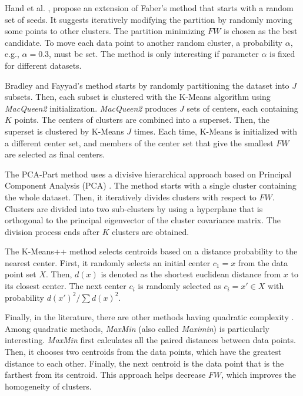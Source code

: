 \documentclass[runningheads,a4paper]{llncs}
\begin{document}
Hand et al. \cite{hand2005optimising}, propose an extension of Faber's method that starts with a random set of seeds. It suggests iteratively modifying the partition by randomly moving some points to other clusters. The partition  minimizing $FW$ is chosen as the best candidate. To move each data point to another random cluster, a probability $\alpha$, e.g., $\alpha = 0.3$, must be set. The method is only interesting if parameter $\alpha$ is fixed for different datasets.

Bradley and Fayyad's method \cite{bradley1998refining} starts by randomly partitioning the dataset into $J$ subsets. Then, each subset is clustered with the K-Means algorithm using \textit{MacQueen2} initialization. \textit{MacQueen2} produces $J$ sets of centers, each containing $K$ points. The centers of clusters are combined into a superset. Then, the superset is clustered by K-Means $J$ times. Each time, K-Means is initialized with a different center set, and members of the center set that give the smallest $FW$ are selected as final centers. 

The PCA-Part method \cite{su2007search} uses a divisive hierarchical approach based on Principal Component Analysis (PCA) \cite{wold1987principal}. The method starts with a single cluster containing the whole dataset. Then, it iteratively divides clusters with respect to $FW$. Clusters are divided into two sub-clusters by using a hyperplane that is orthogonal to the principal eigenvector of the cluster covariance matrix. The division process ends after $K$ clusters are obtained.  

The K-Means++ method \cite{arthur2007k} selects centroids based on a distance probability to the nearest center. First, it randomly selects an initial center $c_1 = x$ from the data point set $X$. Then, $d(x)$ is denoted as the shortest euclidean distance from $x$ to its closest center. The next center $c_i$ is randomly selected as $c_i = x' \in X$ with probability $d(x')^2/\sum d(x)^2$. 

Finally, in the literature, there are other methods having quadratic complexity \cite{lance1967general,astrahan1970speech}. Among quadratic methods, \textit{MaxMin} (also called \textit{Maximin}) \cite{gonzalez1985clustering} is particularly interesting. \textit{MaxMin} first calculates all the paired distances between data points. Then, it chooses two centroids from the data points, which have the greatest distance to each other. Finally, the next centroid is the data point that is the farthest from its centroid. This approach helps decrease $FW$, which improves the homogeneity of clusters. 
\end{document}

